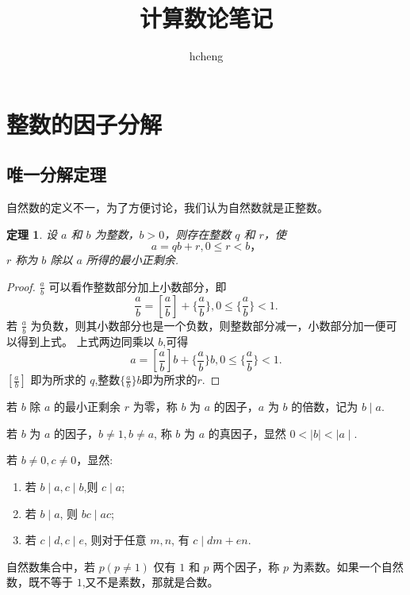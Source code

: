 \documentclass[11pt]{ctexart}
\title{计算数论笔记}
\author{hcheng}
\newtheorem{theorem}{\indent 定理}[section]
\begin{document}
\maketitle
\section{整数的因子分解}
\subsection{唯一分解定理}
自然数的定义不一，为了方便讨论，我们认为自然数就是正整数。
\begin{theorem}
    设 $a$ 和 $b$ 为整数，$b>0$，则存在整数 $q$ 和 $r$，使
    \[
        a = qb + r, 0 \leq r < b，
    \]
    $r$ 称为 $b$ 除以 $a$ 所得的最小正剩余.
\end{theorem}
\begin{proof}
    $\frac{a}{b}$ 可以看作整数部分加上小数部分，即
    \[
        \frac{a}{b} = [\frac{a}{b}] + \{\frac{a}{b}\}, 0 \leq  \{\frac{a}{b}\} < 1.
    \]
    若 $\frac{a}{b}$ 为负数，则其小数部分也是一个负数，则整数部分减一，小数部分加一便可以得到上式。
    上式两边同乘以 $b$,可得
    \[
        a = [\frac{a}{b}]b + \{\frac{a}{b}\}b, 0 \leq \{\frac{a}{b}\} < 1.
    \]
    $[\frac{a}{b}]$ 即为所求的 $q$,整数$\{\frac{a}{b}\}b$即为所求的$r$.
\end{proof}

若 $b$ 除 $a$ 的最小正剩余 $r$ 为零，称 $b$ 为 $a$ 的因子，$a$ 为 $b$ 的倍数，记为 $b\mid a$.

若 $b$ 为 $a$ 的因子，$b \neq 1,b \neq a $, 称 $b$ 为 $a$ 的真因子，显然 $0 < \mid b \mid < \mid a \mid $.

若 $b \neq 0, c \neq 0$，显然:
\begin{enumerate}
    \item 若 $b \mid a, c \mid b$,则 $c \mid a$;
    \item 若 $b \mid a$, 则 $bc \mid ac$;
    \item 若 $c \mid d, c \mid e$, 则对于任意 $m,n$, 有 $c \mid dm+en$.
\end{enumerate}

自然数集合中，若 $p(p \neq 1)$ 仅有 $1$ 和 $p$ 两个因子，称 $p$ 为素数。如果一个自然数，既不等于 $1$,又不是素数，那就是合数。
\end{document}
